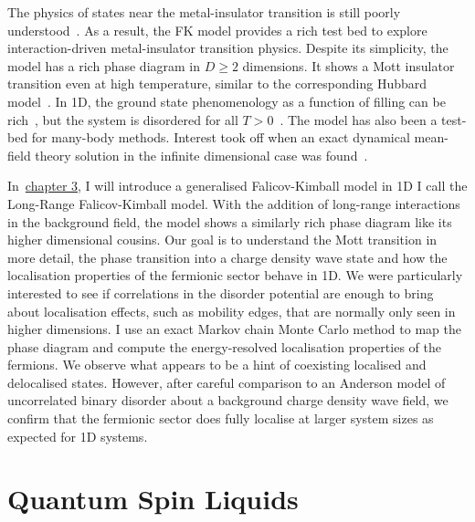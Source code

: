 The physics of states near the metal-insulator transition is still poorly understood~\autocite{belitzAndersonMottTransition1994,baskoMetalInsulatorTransition2006}. As a result, the FK model provides a rich test bed to explore interaction-driven metal-insulator transition physics. Despite its simplicity, the model has a rich phase diagram in \(D \geq 2\) dimensions. It shows a Mott insulator transition even at high temperature, similar to the corresponding Hubbard model~\autocite{brandtThermodynamicsCorrelationFunctions1989}. In 1D, the ground state phenomenology as a function of filling can be rich~\autocite{gruberGroundStatesSpinless1990}, but the system is disordered for all \(T > 0\)~\autocite{kennedyItinerantElectronModel1986}. The model has also been a test-bed for many-body methods. Interest took off when an exact dynamical mean-field theory solution in the infinite dimensional case was found~\autocite{antipovCriticalExponentsStrongly2014,ribicNonlocalCorrelationsSpectral2016,freericksExactDynamicalMeanfield2003,herrmannNonequilibriumDynamicalCluster2016}.

In~\protect\hyperlink{chap:3-the-long-range-falicov-kimball-model}{chapter 3}, I will introduce a generalised Falicov-Kimball model in 1D I call the Long-Range Falicov-Kimball model. With the addition of long-range interactions in the background field, the model shows a similarly rich phase diagram like its higher dimensional cousins. Our goal is to understand the Mott transition in more detail, the phase transition into a charge density wave state and how the localisation properties of the fermionic sector behave in 1D. We were particularly interested to see if correlations in the disorder potential are enough to bring about localisation effects, such as mobility edges, that are normally only seen in higher dimensions. I use an exact Markov chain Monte Carlo method to map the phase diagram and compute the energy-resolved localisation properties of the fermions. We observe what appears to be a hint of coexisting localised and delocalised states. However, after careful comparison to an Anderson model of uncorrelated binary disorder about a background charge density wave field, we confirm that the fermionic sector does fully localise at larger system sizes as expected for 1D systems.

\hypertarget{quantum-spin-liquids}{%
\section{Quantum Spin Liquids}\label{quantum-spin-liquids}}

